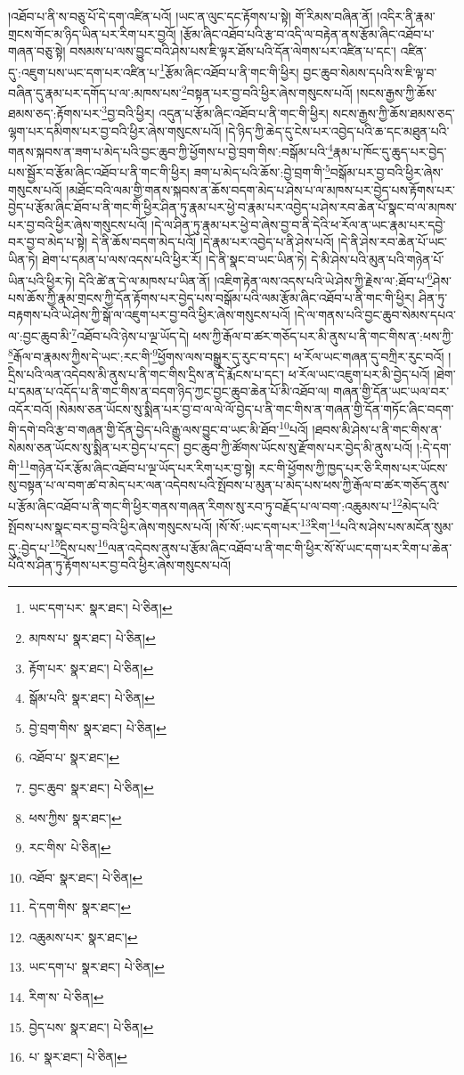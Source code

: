 །འཐོབ་པ་ནི་ས་བཅུ་པོ་དེ་དག་འཛིན་པའོ། །ཡང་ན་ལུང་དང་རྟོགས་པ་སྟེ། གོ་རིམས་བཞིན་ནོ། །འདིར་ནི་རྣམ་གྲངས་གོང་མ་ཉིད་ཡིན་པར་རིག་པར་བྱའོ། །རྩོམ་ཞིང་འཐོབ་པའི་རྩ་བ་འདི་ལ་བརྟེན་ནས་རྩོམ་ཞིང་འཐོབ་པ་གཞན་བཅུ་སྟེ། བསམས་པ་ལས་བྱུང་བའི་ཤེས་པས་ཇི་ལྟར་ཐོས་པའི་དོན་ལེགས་པར་འཛིན་པ་དང་། འཛིན་དུ་:འཇུག་པས་ཡང་དག་པར་འཛིན་པ་\footnote{ཡང་དག་པར་  སྣར་ཐང་།  པེ་ཅིན། }རྩོམ་ཞིང་འཐོབ་པ་ནི་གང་གི་ཕྱིར། བྱང་ཆུབ་སེམས་དཔའི་ས་ཇི་ལྟ་བ་བཞིན་དུ་རྣམ་པར་དགོད་པ་ལ་:མཁས་པས་\footnote{མཁས་པ་  སྣར་ཐང་།  པེ་ཅིན། }བསྟན་པར་བྱ་བའི་ཕྱིར་ཞེས་གསུངས་པའོ། །སངས་རྒྱས་ཀྱི་ཆོས་ཐམས་ཅད་:རྟོགས་པར་\footnote{རྟོག་པར་  སྣར་ཐང་།  པེ་ཅིན། }བྱ་བའི་ཕྱིར། འདུན་པ་རྩོམ་ཞིང་འཐོབ་པ་ནི་གང་གི་ཕྱིར། སངས་རྒྱས་ཀྱི་ཆོས་ཐམས་ཅད་ལྷག་པར་དམིགས་པར་བྱ་བའི་ཕྱིར་ཞེས་གསུངས་པའོ། །དེ་ཉིད་ཀྱི་ཆེད་དུ་ངེས་པར་འབྱེད་པའི་ཆ་དང་མཐུན་པའི་གནས་སྐབས་ན་ཟག་པ་མེད་པའི་བྱང་ཆུབ་ཀྱི་ཕྱོགས་པ་བྱེ་བྲག་གིས་:བསྒོམ་པའི་\footnote{སྒོམ་པའི་  སྣར་ཐང་།  པེ་ཅིན། }རྣམ་པ་ཁོང་དུ་ཆུད་པར་བྱེད་པས་སྦྱོར་བ་རྩོམ་ཞིང་འཐོབ་པ་ནི་གང་གི་ཕྱིར། ཟག་པ་མེད་པའི་ཆོས་:བྱེ་བྲག་གི་\footnote{བྱེ་བྲག་གིས་  སྣར་ཐང་།  པེ་ཅིན། }བསྒོམ་པར་བྱ་བའི་ཕྱིར་ཞེས་གསུངས་པའོ། །མཐོང་བའི་ལམ་གྱི་གནས་སྐབས་ན་ཆོས་བདག་མེད་པ་ཤེས་པ་ལ་མཁས་པར་བྱེད་པས་རྟོགས་པར་བྱེད་པ་རྩོམ་ཞིང་ཐོབ་པ་ནི་གང་གི་ཕྱིར་ཤིན་ཏུ་རྣམ་པར་ཕྱེ་བ་རྣམ་པར་འབྱེད་པ་ཤེས་རབ་ཆེན་པོ་སྣང་བ་ལ་མཁས་པར་བྱ་བའི་ཕྱིར་ཞེས་གསུངས་པའོ། །དེ་ལ་ཤིན་ཏུ་རྣམ་པར་ཕྱེ་བ་ཞེས་བྱ་བ་ནི་དེའི་ཕ་རོལ་ན་ཡང་རྣམ་པར་དབྱེ་བར་བྱ་བ་མེད་པ་སྟེ། དེ་ནི་ཆོས་བདག་མེད་པའོ། །དེ་རྣམ་པར་འབྱེད་པ་ནི་ཤེས་པའོ། །དེ་ནི་ཤེས་རབ་ཆེན་པོ་ཡང་ཡིན་ཏེ། ཐེག་པ་དམན་པ་ལས་འདས་པའི་ཕྱིར་རོ། །དེ་ནི་སྣང་བ་ཡང་ཡིན་ཏེ། དེ་མི་ཤེས་པའི་མུན་པའི་གཉེན་པོ་ཡིན་པའི་ཕྱིར་ཏེ། དེའི་ཚེ་ན་དེ་ལ་མཁས་པ་ཡིན་ནོ། །འཇིག་རྟེན་ལས་འདས་པའི་ཡེ་ཤེས་ཀྱི་རྗེས་ལ་:ཐོབ་པ་\footnote{འཐོབ་པ་  སྣར་ཐང་། }ཤེས་པས་ཆོས་ཀྱི་རྣམ་གྲངས་ཀྱི་དོན་རྟོགས་པར་བྱེད་པས་བསྒོམ་པའི་ལམ་རྩོམ་ཞིང་འཐོབ་པ་ནི་གང་གི་ཕྱིར། ཤིན་ཏུ་བརྟགས་པའི་ཡེ་ཤེས་ཀྱི་སྒོ་ལ་འཇུག་པར་བྱ་བའི་ཕྱིར་ཞེས་གསུངས་པའོ། །དེ་ལ་གནས་པའི་བྱང་ཆུབ་སེམས་དཔའ་ལ་:བྱང་ཆུབ་མི་\footnote{བྱང་ཆུབ་  སྣར་ཐང་།  པེ་ཅིན། }འཐོབ་པའི་ཉེས་པ་ལྔ་ཡོད་དེ། ཕས་ཀྱི་རྒོལ་བ་ཚར་གཅོད་པར་མི་ནུས་པ་ནི་གང་གིས་ན་:ཕས་ཀྱི་\footnote{ཕས་ཀྱིས་  སྣར་ཐང་། }རྒོལ་བ་རྣམས་ཀྱིས་དེ་ཡང་:རང་གི་\footnote{རང་གིས་  པེ་ཅིན། }ཕྱོགས་ལས་བསྒྱུར་དུ་རུང་བ་དང་། ཕ་རོལ་ཡང་གཞན་དུ་བཀྲིར་རུང་བའོ། །དྲིས་པའི་ལན་འདེབས་མི་ནུས་པ་ནི་གང་གིས་དྲིས་ན་དེ་རྨོངས་པ་དང་། ཕ་རོལ་ཡང་འཇུག་པར་མི་བྱེད་པའོ། །ཐེག་པ་དམན་པ་འདོད་པ་ནི་གང་གིས་ན་བདག་ཉིད་ཀྱང་བྱང་ཆུབ་ཆེན་པོ་མི་འཐོབ་ལ། གཞན་གྱི་དོན་ཡང་ཡལ་བར་འདོར་བའོ། །སེམས་ཅན་ཡོངས་སུ་སྨིན་པར་བྱ་བ་ལ་ལེ་ལོ་བྱེད་པ་ནི་གང་གིས་ན་གཞན་གྱི་དོན་གཏོང་ཞིང་བདག་གི་དགེ་བའི་རྩ་བ་གཞན་གྱི་དོན་བྱེད་པའི་རྒྱུ་ལས་བྱུང་བ་ཡང་མི་ཐོབ་\footnote{འཐོབ་  སྣར་ཐང་།  པེ་ཅིན། }པའོ། །ཐབས་མི་ཤེས་པ་ནི་གང་གིས་ན་སེམས་ཅན་ཡོངས་སུ་སྨིན་པར་བྱེད་པ་དང་། བྱང་ཆུབ་ཀྱི་ཚོགས་ཡོངས་སུ་རྫོགས་པར་བྱེད་མི་ནུས་པའོ། །:དེ་དག་གི་\footnote{དེ་དག་གིས་  སྣར་ཐང་། }གཉེན་པོར་རྩོམ་ཞིང་འཐོབ་པ་ལྔ་ཡོད་པར་རིག་པར་བྱ་སྟེ། རང་གི་ཕྱོགས་ཀྱི་ཁྱད་པར་ཅི་རིགས་པར་ཡོངས་སུ་བསྟན་པ་ལ་བག་ཚ་བ་མེད་པར་ལན་འདེབས་པའི་སྤོབས་པ་མུན་པ་མེད་པས་ཕས་ཀྱི་རྒོལ་བ་ཚར་གཅོད་ནུས་པ་རྩོམ་ཞིང་འཐོབ་པ་ནི་གང་གི་ཕྱིར་གནས་གཞན་རིགས་སུ་རབ་ཏུ་བརྗོད་པ་ལ་བག་:འཆུམས་པ་\footnote{འཆུམས་པར་  སྣར་ཐང་། }མེད་པའི་སྤོབས་པས་སྣང་བར་བྱ་བའི་ཕྱིར་ཞེས་གསུངས་པའོ། །སོ་སོ་:ཡང་དག་པར་\footnote{ཡང་དག་པ་  སྣར་ཐང་།  པེ་ཅིན། }རིག་\footnote{རིག་ས་  པེ་ཅིན། }པའི་ས་ཤེས་པས་མངོན་སུམ་དུ་:བྱེད་པ་\footnote{བྱེད་པས་  སྣར་ཐང་།  པེ་ཅིན། }དྲིས་པས་\footnote{པ་  སྣར་ཐང་།  པེ་ཅིན། }ལན་འདེབས་ནུས་པ་རྩོམ་ཞིང་འཐོབ་པ་ནི་གང་གི་ཕྱིར་སོ་སོ་ཡང་དག་པར་རིག་པ་ཆེན་པོའི་ས་ཤིན་ཏུ་རྟོགས་པར་བྱ་བའི་ཕྱིར་ཞེས་གསུངས་པའོ། 